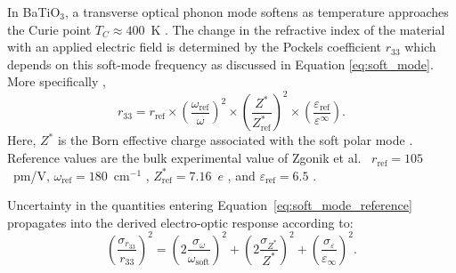 \documentclass[twocolumn,superscriptaddress,amsmath,amssymb,longbibliography]{revtex4-2}
\begin{document}
In BaTiO$_3$, a transverse optical phonon mode softens as temperature approaches the Curie point $T_C \approx 400$~K \cite{Lines2001,Cochran1960,Zhong1994_BTO,Zhong1995}. The change in the refractive index of the material with an applied electric field is determined by the Pockels coefficient $r_{33}$ which depends on this soft-mode frequency as discussed in Equation \ref{eq:soft_mode}. More specifically \cite{Veithen2005},
\begin{equation}
    r_{33} = r_{\mathrm{ref}} \times \left(\frac{\omega_{\mathrm{ref}}}{\omega }\right)^2\times
\left(\frac{Z^*}{Z^*_{\mathrm{ref}}}\right)^2 \times
\left(\frac{\varepsilon_{\mathrm{ref}}}{\varepsilon^\infty}\right).
\label{eq:soft_mode_reference}
\end{equation}
Here, $Z^*$ is the Born effective charge associated with the soft polar mode
\cite{Ghosez1998_BEC,Resta1994_BEC,KingSmith1993}. Reference values are the
bulk experimental value of Zgonik et al.\ \cite{Zgonik1994}
$r_{\mathrm{ref}} = 105$~pm/V, $\omega_{\mathrm{ref}} = 180$~cm$^{-1}$
\cite{Lines2001}, $Z^*_{\mathrm{ref}} = 7.16$~$e$
\cite{Ghosez1998_BEC}, and $\varepsilon_{\mathrm{ref}} = 6.5$
\cite{Ghosez1998_BEC}.

Uncertainty in the quantities entering Equation~\ref{eq:soft_mode_reference}
propagates into the derived electro-optic response according to:
\begin{equation}
\left(\frac{\sigma_{r_{33}}}{r_{33}}\right)^2
=
\left(2\frac{\sigma_{\omega}}{\omega_{\mathrm{soft}}}\right)^2
+
\left(2\frac{\sigma_{Z^*}}{Z^*}\right)^2
+
\left(\frac{\sigma_{\varepsilon}}{\varepsilon_{\infty}}\right)^2 .
\label{eq:r33_uncertainty}
\end{equation}



\end{document}
